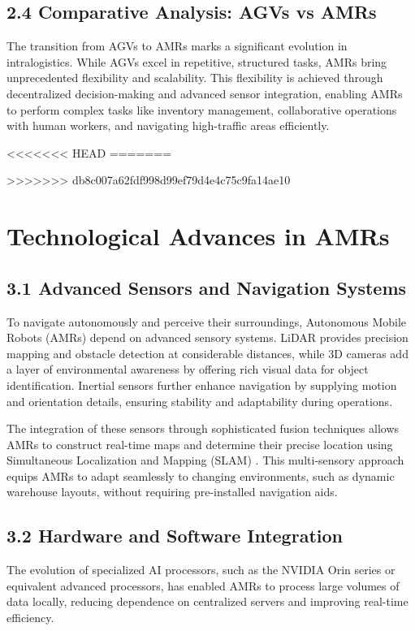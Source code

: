 \documentclass[conference]{IEEEtran}
\begin{document}
\subsection*{\textbf{2.4 Comparative Analysis: AGVs vs AMRs}}
The transition from AGVs to AMRs marks a significant evolution in intralogistics. While AGVs excel in repetitive, structured tasks, AMRs bring unprecedented flexibility and scalability. This flexibility is achieved through decentralized decision-making and advanced sensor integration, enabling AMRs to perform complex tasks like inventory management, collaborative operations with human workers, and navigating high-traffic areas efficiently.

<<<<<<< HEAD
=======

>>>>>>> db8c007a62fdf998d99ef79d4e4c75c9fa14ae10
\section{Technological Advances in AMRs}

\subsection*{\textbf{3.1 Advanced Sensors and Navigation Systems}}
To navigate autonomously and perceive their surroundings, Autonomous Mobile Robots (AMRs) depend on advanced sensory systems. LiDAR provides precision mapping and obstacle detection at considerable distances, while 3D cameras add a layer of environmental awareness by offering rich visual data for object identification. Inertial sensors further enhance navigation by supplying motion and orientation details, ensuring stability and adaptability during operations.

The integration of these sensors through sophisticated fusion techniques allows AMRs to construct real-time maps and determine their precise location using Simultaneous Localization and Mapping (SLAM) \cite{1}. This multi-sensory approach equips AMRs to adapt seamlessly to changing environments, such as dynamic warehouse layouts, without requiring pre-installed navigation aids.

\subsection*{\textbf{3.2 Hardware and Software Integration}}
The evolution of specialized AI processors, such as the NVIDIA Orin series or equivalent advanced processors, has enabled AMRs to process large volumes of data locally, reducing dependence on centralized servers and improving real-time efficiency. 
\end{document}
